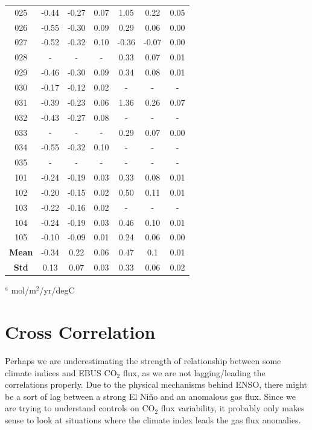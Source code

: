 \documentclass[12pt]{article}
\begin{document}
\begin{table}[!h]
\begin{tabular}{c c c c | c c c}
		025 &  -0.44 &    -0.27 &       0.07 &   1.05 &     0.22 &       0.05 \\
		026 &  -0.55 &    -0.30 &       0.09 &   0.29 &     0.06 &       0.00 \\
		027 &  -0.52 &    -0.32 &       0.10 &  -0.36 &    -0.07 &       0.00 \\
		028 &    - &      - &        - &   0.33 &     0.07 &       0.01 \\
		029 &  -0.46 &    -0.30 &       0.09 &   0.34 &     0.08 &       0.01 \\
		030 &  -0.17 &    -0.12 &       0.02 &    - &      - &        - \\
		031 &  -0.39 &    -0.23 &       0.06 &   1.36 &     0.26 &       0.07 \\
		032 &  -0.43 &    -0.27 &       0.08 &    - &      - &        - \\
		033 &    - &      - &        - &   0.29 &     0.07 &       0.00 \\
		034 &  -0.55 &    -0.32 &       0.10 &    - &      - &        - \\
		035 &    - &      - &        - &    - &      - &        - \\
		101 &  -0.24 &    -0.19 &       0.03 &   0.33 &     0.08 &       0.01 \\
		102 &  -0.20 &    -0.15 &       0.02 &   0.50 &     0.11 &       0.01 \\
		103 &  -0.22 &    -0.16 &       0.02 &    - &      - &        - \\
		104 &  -0.24 &    -0.19 &       0.03 &   0.46 &     0.10 &       0.01 \\
		105 &  -0.10 &    -0.09 &       0.01 &   0.24 &     0.06 &       0.00 \\
		\bottomrule
		\textbf{Mean} & -0.34 & 0.22 & 0.06 & 0.47 & 0.1 & 0.01 \\
		\textbf{Std} & 0.13 & 0.07 & 0.03 & 0.33 & 0.06 & 0.02
	\end{tabular}
	\begin{tablenotes}
		\centering
		\item $^{a}$ mol/m$^{2}$/yr/degC
	\end{tablenotes}
	\label{tab:amo-atlantic}
\end{table}

\section{Cross Correlation}
Perhaps we are underestimating the strength of relationship between some climate indices and EBUS CO$_{2}$ flux, as we are not lagging/leading the correlations properly. Due to the physical mechanisms behind ENSO, there might be a sort of lag between a strong El Ni\~no and an anomalous gas flux. Since we are trying to understand controls on CO$_{2}$ flux variability, it probably only makes sense to look at situations where the climate index leads the gas flux anomalies. \\
\end{document}
